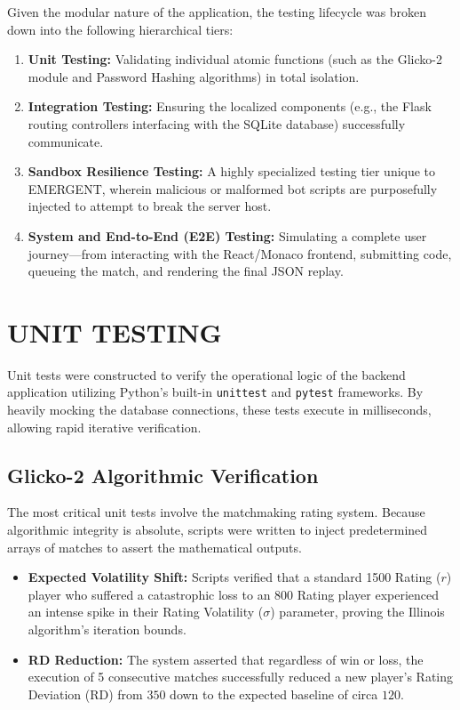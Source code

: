 \documentclass[12pt,a4paper]{report}
\begin{document}
Given the modular nature of the application, the testing lifecycle was broken down into the following hierarchical tiers:
\begin{enumerate}
    \item \textbf{Unit Testing:} Validating individual atomic functions (such as the Glicko-2 module and Password Hashing algorithms) in total isolation.
    \item \textbf{Integration Testing:} Ensuring the localized components (e.g., the Flask routing controllers interfacing with the SQLite database) successfully communicate.
    \item \textbf{Sandbox Resilience Testing:} A highly specialized testing tier unique to EMERGENT, wherein malicious or malformed bot scripts are purposefully injected to attempt to break the server host.
    \item \textbf{System and End-to-End (E2E) Testing:} Simulating a complete user journey—from interacting with the React/Monaco frontend, submitting code, queueing the match, and rendering the final JSON replay.
\end{enumerate}

\section{UNIT TESTING}
Unit tests were constructed to verify the operational logic of the backend application utilizing Python’s built-in \texttt{unittest} and \texttt{pytest} frameworks. By heavily mocking the database connections, these tests execute in milliseconds, allowing rapid iterative verification.

\subsection{Glicko-2 Algorithmic Verification}
The most critical unit tests involve the matchmaking rating system. Because algorithmic integrity is absolute, scripts were written to inject predetermined arrays of matches to assert the mathematical outputs.
\begin{itemize}
    \item \textbf{Expected Volatility Shift:} Scripts verified that a standard 1500 Rating ($r$) player who suffered a catastrophic loss to an 800 Rating player experienced an intense spike in their Rating Volatility ($\sigma$) parameter, proving the Illinois algorithm's iteration bounds.
    \item \textbf{RD Reduction:} The system asserted that regardless of win or loss, the execution of 5 consecutive matches successfully reduced a new player's Rating Deviation (RD) from $350$ down to the expected baseline of circa $120$.
\end{itemize}
\end{document}
